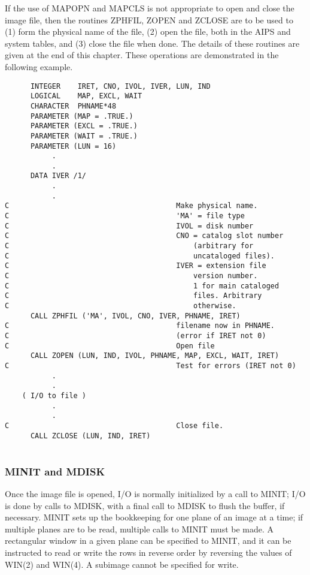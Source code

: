 If the use of MAPOPN and MAPCLS is not appropriate to open and close
the image file, then the routines ZPHFIL, ZOPEN and ZCLOSE are to be
used to (1) form the physical name of the file, (2) open the file,
both in the AIPS and system tables, and (3) close the file when done.
The details of these routines are given at the end of this chapter.
These operations are demonstrated in the following example.
\vspace{  0.85cm}
\begin{verbatim}
      INTEGER    IRET, CNO, IVOL, IVER, LUN, IND
      LOGICAL    MAP, EXCL, WAIT
      CHARACTER  PHNAME*48
      PARAMETER (MAP = .TRUE.)
      PARAMETER (EXCL = .TRUE.)
      PARAMETER (WAIT = .TRUE.)
      PARAMETER (LUN = 16)
           .
           .
      DATA IVER /1/
           .
           .
C                                       Make physical name.
C                                       'MA' = file type
C                                       IVOL = disk number
C                                       CNO = catalog slot number
C                                           (arbitrary for
C                                           uncataloged files).
C                                       IVER = extension file
C                                           version number.
C                                           1 for main cataloged
C                                           files. Arbitrary
C                                           otherwise.
      CALL ZPHFIL ('MA', IVOL, CNO, IVER, PHNAME, IRET)
C                                       filename now in PHNAME.
C                                       (error if IRET not 0)
C                                       Open file
      CALL ZOPEN (LUN, IND, IVOL, PHNAME, MAP, EXCL, WAIT, IRET)
C                                       Test for errors (IRET not 0)
           .
           .
    ( I/O to file )
           .
           .
C                                       Close file.
      CALL ZCLOSE (LUN, IND, IRET)


\end{verbatim}
\subsubsection{MINIT and MDISK}
Once the image file is opened, I/O is normally initialized by a call
to MINIT; I/O is done by calls to MDISK, with a final call to MDISK
to flush the buffer, if necessary.  MINIT sets up the bookkeeping for
one plane of an image at a time; if multiple planes are to be read,
multiple calls to MINIT must be made.  A rectangular window in a
given plane can be specified to MINIT, and it can be instructed to
read or write the rows in reverse order by reversing the values of
WIN(2) and WIN(4).  A subimage cannot be specified for write.

